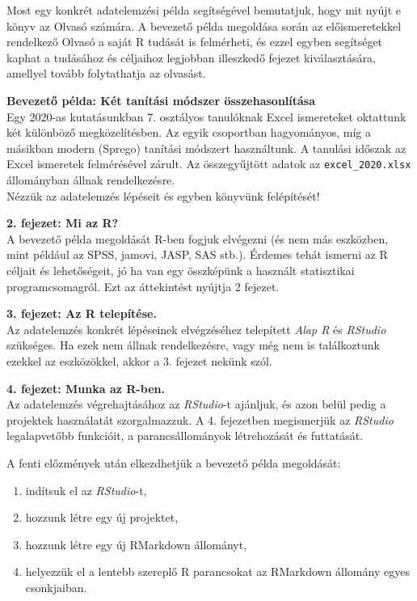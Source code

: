 \documentclass[
]{book}
\providecommand{\tightlist}{%
  \setlength{\itemsep}{0pt}\setlength{\parskip}{0pt}}
\begin{document}
Most egy konkrét adatelemzési példa segítségével bemutatjuk, hogy mit nyújt e könyv az Olvasó számára. A bevezető példa megoldása során az előismeretekkel rendelkező Olvasó a saját R tudását is felmérheti, és ezzel egyben segítséget kaphat a tudásához és céljaihoz legjobban illeszkedő fejezet kiválasztására, amellyel tovább folytathatja az olvasást.

\textbf{Bevezető példa: Két tanítási módszer összehasonlítása}\\
Egy 2020-as kutatásunkban \citep{Csapo2020} 7. osztályos tanulóknak Excel ismereteket oktattunk két különböző megközelítésben. Az egyik csoportban hagyományos, míg a másikban modern (Sprego) tanítási módszert használtunk. A tanulási időszak az Excel ismeretek felmérésével zárult. Az összegyűjtött adatok az \texttt{excel\_2020.xlsx} állományban állnak rendelkezésre.\\
Nézzük az adatelemzés lépéseit és egyben könyvünk felépítését!

\textbf{2. fejezet: Mi az R?}\\
A bevezető példa megoldását R-ben fogjuk elvégezni (és nem más eszközben, mint például az SPSS, jamovi, JASP, SAS stb.). Érdemes tehát ismerni az R céljait és lehetőségeit, jó ha van egy összképünk a használt statisztikai programcsomagról. Ezt az áttekintést nyújtja 2 fejezet.

\textbf{3. fejezet: Az R telepítése.}\\
Az adatelemzés konkrét lépéseinek elvégzéséhez telepített \emph{Alap R} és \emph{RStudio} szükséges. Ha ezek nem állnak rendelkezésre, vagy még nem is találkoztunk ezekkel az eszközökkel, akkor a 3. fejezet nekünk szól.

\textbf{4. fejezet: Munka az R-ben.}\\
Az adatelemzés végrehajtásához az \emph{RStudio}-t ajánljuk, és azon belül pedig a projektek használatát szorgalmazzuk. A 4. fejezetben megismerjük az \emph{RStudio} legalapvetőbb funkcióit, a parancsállományok létrehozását és futtatását.

A fenti előzmények után elkezdhetjük a bevezető példa megoldását:

\begin{enumerate}
\def\labelenumi{\arabic{enumi}.}
\tightlist
\item
  indítsuk el az \emph{RStudio}-t,
\item
  hozzunk létre egy új projektet,
\item
  hozzunk létre egy új RMarkdown állományt,
\item
  helyezzük el a lentebb szereplő R parancsokat az RMarkdown állomány egyes csonkjaiban.
\end{enumerate}
\end{document}
